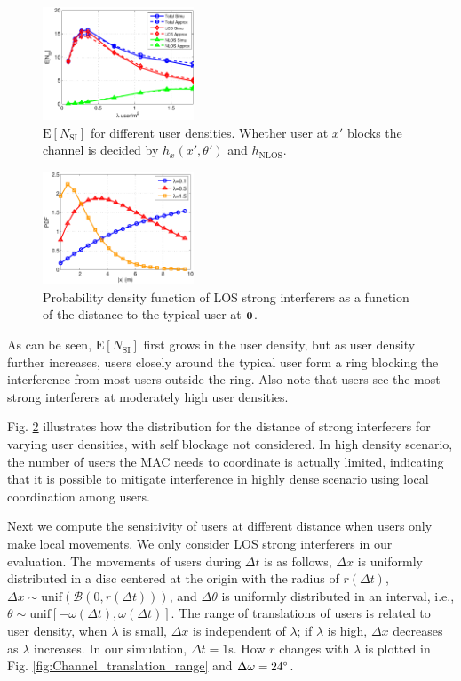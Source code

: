 \documentclass[10pt, conference, letterpaper]{IEEEtran}
\begin{document}
\begin{figure}
	\centering
	\includegraphics[width = 0.4\textwidth]{Channel_en_si.pdf}
	\caption{$\mathrm{E}[N_{\mathrm{SI}}]$ for different user densities. Whether user at $x'$ blocks the channel is decided by $h_x(x',\theta')$ and $h_{\mathrm{NLOS}}$.}
	\label{fig:Channel_en_si}
\end{figure}


\begin{figure}
	\centering
	\includegraphics[width = 0.4\textwidth]{Channel_si_pdf.pdf}
	\caption{Probability density function of LOS strong interferers as a function of the distance to the typical user at $\bf{0}$.}
	\label{fig:Channel_si_pdf}
\end{figure}

As can be seen, $\mathrm{E}[N_{\mathrm{SI}}]$ first grows in the user density, but as user density further increases, users closely around the typical user form a ring blocking the interference from most users outside the ring. Also note that users see the most strong interferers at moderately high user densities. 

Fig. \ref{fig:Channel_si_pdf} illustrates how the distribution for the distance of strong interferers for varying user densities, with self blockage not considered. In high density scenario, the number of users the MAC needs to coordinate is actually limited, indicating that it is possible to mitigate interference in highly dense scenario using local coordination among users.

Next we compute the sensitivity of users at different distance when users only make local movements. We only consider LOS strong interferers in our evaluation. The movements of users during $\Delta t$ is as follows, $\Delta x$ is uniformly distributed in a disc centered at the origin with the radius of $r(\Delta t)$, $\Delta x \sim \mathrm{unif}(\mathcal{B}(0, r(\Delta t)))$, and $\Delta \theta$ is uniformly distributed in an interval, i.e., $\theta \sim \mathrm{unif}[-\omega(\Delta t), \omega(\Delta t)]$. The range of translations of users is related to user density, when $\lambda$ is small, $\Delta x$ is independent of $\lambda$; if $\lambda$ is high, $\Delta x$ decreases as $\lambda$ increases. In our simulation, $\Delta t = 1$s. How $r$ changes with $\lambda$ is plotted in Fig. \ref{fig:Channel_translation_range} and $\Delta \omega = 24\degree$.
\end{document}
